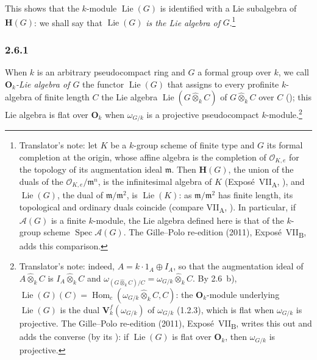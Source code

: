 This shows that the \(k\)-module \(\operatorname{Lie}(G)\) is identified
with a Lie subalgebra of \(\mathbf H(G)\): we shall say that
\(\operatorname{Lie}(G)\) \emph{is the Lie algebra of} \(G\).\footnote{Translator's note: let
\(K\) be a \(k\)-group scheme of finite type and \(G\) its formal completion at the origin, whose affine
algebra is the completion of \(\mathcal O_{K,e}\) for the topology of its augmentation ideal
\(\mathfrak m\). Then \(\mathbf H(G)\), the union of the duals of the \(\mathcal O_{K,e}/\mathfrak m^{n}\),
is the infinitesimal algebra of \(K\) (Expos\'e~VII\textsubscript{A}, ), and
\(\operatorname{Lie}(G)\), the dual of \(\mathfrak m/\mathfrak m^2\), is \(\operatorname{Lie}(K)\): as
\(\mathfrak m/\mathfrak m^2\) has finite length, its topological and ordinary duals coincide (compare
VII\textsubscript{A}, ). In particular, if \(\mathcal A(G)\) is a finite \(k\)-module, the Lie
algebra defined here is that of the \(k\)-group scheme \(\operatorname{Spec}\mathcal A(G)\). The
Gille--Polo re-edition (2011), Expos\'e~VII\textsubscript{B}, adds this comparison.}

\subsubsection*{2.6.1}
\label{sga3:VIIB:2.6.1}

When \(k\) is an arbitrary pseudocompact ring and \(G\) a formal group
over \(k\), we call \emph{\(\mathbf O_k\)-Lie algebra of \(G\)} the functor
\(\operatorname{Lie}(G)\) that assigns to every profinite \(k\)-algebra of
finite length \(C\) the Lie algebra \(\operatorname{Lie}(G\widehat\otimes_kC)\)
of \(G\widehat\otimes_kC\) over \(C\) \textup{()}; this Lie algebra is flat
over \(\mathbf O_k\) when \(\omega_{G/k}\) is a projective pseudocompact
\(k\)-module.\footnote{Translator's note: indeed, \(A=k\cdot1_A\oplus I_A\), so that the augmentation
ideal of \(A\widehat\otimes_kC\) is \(I_A\widehat\otimes_kC\) and
\(\omega_{(G\widehat\otimes_kC)/C}=\omega_{G/k}\widehat\otimes_kC\). By 2.6~b),
\(\operatorname{Lie}(G)(C)=\operatorname{Hom}_c(\omega_{G/k}\widehat\otimes_kC,C)\): the \(\mathbf O_k\)-module
underlying \(\operatorname{Lie}(G)\) is the dual \(\mathbf V_k^f(\omega_{G/k})\) of \(\omega_{G/k}\) (1.2.3),
which is flat when \(\omega_{G/k}\) is projective. The Gille--Polo re-edition (2011),
Expos\'e~VII\textsubscript{B}, writes this out and adds the converse (by its
): if \(\operatorname{Lie}(G)\) is flat over \(\mathbf O_k\), then \(\omega_{G/k}\)
is projective.}
